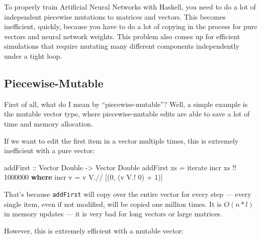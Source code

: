 \documentclass[]{article}
\newenvironment{Shaded}{}{}
\newcommand{\DataTypeTok}[1]{\textcolor[rgb]{0.56,0.13,0.00}{#1}}
\newcommand{\DecValTok}[1]{\textcolor[rgb]{0.25,0.63,0.44}{#1}}
\newcommand{\FunctionTok}[1]{\textcolor[rgb]{0.02,0.16,0.49}{#1}}
\newcommand{\KeywordTok}[1]{\textcolor[rgb]{0.00,0.44,0.13}{\textbf{#1}}}
\newcommand{\NormalTok}[1]{#1}
\newcommand{\OperatorTok}[1]{\textcolor[rgb]{0.40,0.40,0.40}{#1}}
\newcommand{\OtherTok}[1]{\textcolor[rgb]{0.00,0.44,0.13}{#1}}
\begin{document}
To properly train Artificial Neural Networks with Haskell, you need to do a lot
of independent piecewise mutations to matrices and vectors. This becomes
inefficient, quickly, because you have to do a lot of copying in the process for
pure vectors and neural network weights. This problem also comes up for
efficient simulations that require mutating many different components
independently under a tight loop.

\subsection{Piecewise-Mutable}\label{piecewise-mutable}

First of all, what do I mean by ``piecewise-mutable''? Well, a simple example is
the mutable vector type, where piecewise-mutable edits are able to save a lot of
time and memory allocation.

If we want to edit the first item in a vector multiple times, this is extremely
inefficient with a pure vector:

\begin{Shaded}
\begin{Highlighting}[]
\OtherTok{addFirst ::} \DataTypeTok{Vector} \DataTypeTok{Double} \OtherTok{{-}\textgreater{}} \DataTypeTok{Vector} \DataTypeTok{Double}
\NormalTok{addFirst xs }\OtherTok{=} \FunctionTok{iterate}\NormalTok{ incr xs }\OperatorTok{!!} \DecValTok{1000000}
  \KeywordTok{where}
\NormalTok{    incr v }\OtherTok{=}\NormalTok{ v }\OperatorTok{V.//}\NormalTok{ [(}\DecValTok{0}\NormalTok{, (v }\OperatorTok{V.!} \DecValTok{0}\NormalTok{) }\OperatorTok{+} \DecValTok{1}\NormalTok{)]}
\end{Highlighting}
\end{Shaded}

That's because \texttt{addFirst} will copy over the entire vector for every step
--- every single item, even if not modified, will be copied one million times.
It is \(O(n*l)\) in memory updates --- it is very bad for long vectors or large
matrices.

However, this is extremely efficient with a mutable vector:

\begin{Shaded}
\end{Shaded}
\end{document}
